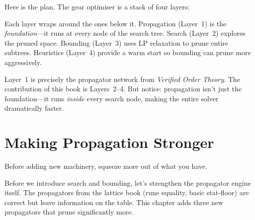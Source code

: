 \documentclass[11pt, a4paper, oneside]{book}
\begin{document}
Here is the plan.  The gear optimiser is a stack of four layers:

\begin{center}
\end{center}

Each layer wraps around the ones below it.  Propagation (Layer~1) is the
\emph{foundation}---it runs at every node of the search tree.  Search (Layer~2)
explores the pruned space.  Bounding (Layer~3) uses LP relaxation to prune
entire subtrees.  Heuristics (Layer~4) provide a warm start so bounding can
prune more aggressively.

\begin{crossrefbox}
Layer~1 is precisely the propagator network from \emph{Verified Order
Theory}.  The contribution of this book is Layers~2--4.  But notice:
propagation isn't just the foundation---it runs \emph{inside} every
search node, making the entire solver dramatically faster.
\end{crossrefbox}

\chapter{Making Propagation Stronger}
\label{ch:stronger}

\epigraph{Before adding new machinery, squeeze more out of what you have.}{}

Before we introduce search and bounding, let's strengthen the propagator
engine itself.  The propagators from the lattice book (rune equality,
basic stat-floor) are correct but leave information on the table.  This
chapter adds three new propagators that prune significantly more.
\end{document}
